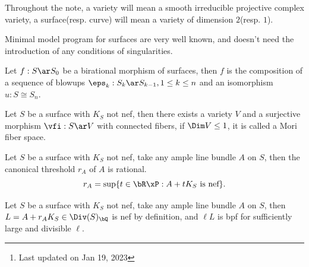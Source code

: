 \documentclass[a4paper, twoside]{article}
\title{\tbf{Ciliberto2020}}
\author{\tbf{Notes} by Cong Wen, 01/2023}
\date{}
\begin{document}
\maketitle
\thispagestyle{empty}
\begin{abstract}
	This is my self-use notes\footnote{Last updated on Jan 19, 2023} on \cite{Ciliberto2020}. Please reach out if you find anything incorrect.

\end{abstract}
\tableofcontents



\begin{stp}
	Throughout the note, a variety will mean a smooth irreducible projective complex variety, a surface(resp. curve) will mean a variety of dimension $2$(resp. $1$).
\end{stp}

Minimal model program for surfaces are very well known, and doesn't need the introduction of any conditions of singularities.

\begin{thm}
	Let $f:S\ar S_{0}$ be a birational morphism of surfaces, then $f$ is the composition of a sequence of blowups $\eps_{k}:S_{k}\ar S_{k-1},1\leq k\leq n$ and an isomorphism $u:S\cong S_{n}$.
\end{thm}

\begin{thm}
	Let $S$ be a surface with $K_{S}$ not nef, then there exists a variety $V$ and a surjective morphism $\vfi:S\ar V$ with connected fibers, if $\Dim V\leq1$, it is called a Mori fiber space.
\end{thm}

\begin{thm}
	Let $S$ be a surface with $K_{S}$ not nef, take any ample line bundle $A$ on $S$, then the canonical threshold $r_{A}$ of $A$ is rational.
	\[
		r_{A}=\sup\{t\in\bR\xP: \text{$A+tK_{S}$ is nef}\}.
	\]
\end{thm}

\begin{thm}
	Let $S$ be a surface with $K_{S}$ not nef, take any ample line bundle $A$ on $S$, then $L=A+r_{A}K_{S}\in\Div(S)_{\bQ}$ is nef by definition, and $\ell L$ is bpf for sufficiently large and divisible $\ell$.
\end{thm}
\end{document}
